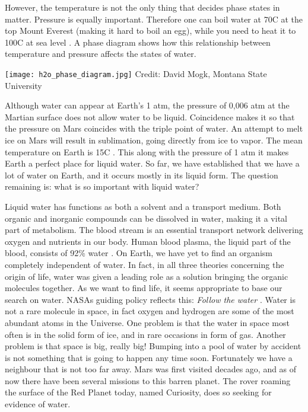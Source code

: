 However, the temperature is not the only thing that decides phase states in matter.
Pressure is equally important.
Therefore one can boil water at 70\degree C at the top Mount Everest (making it hard to boil an egg), while you need to heat it to 100\degree C at sea level \cite{WaterEverest}.
A phase diagram shows how this relationship between temperature and pressure affects the states of water.

\begin{center}
	\texttt{[image: h2o\_phase\_diagram.jpg]}
	\tiny{Credit: David Mogk, Montana State University}
\end{center}

Although water can appear at Earth's 1 atm, the pressure of 0,006 atm at the Martian surface \cite{NASA-rover} does not allow water to be liquid.
Coincidence makes it so that the pressure on Mars coincides with the triple point of water.
An attempt to melt ice on Mars will result in sublimation, going directly from ice to vapor.
The mean temperature on Earth is 15\degree C \cite{TempEarth}.
This along with the pressure of 1 atm it makes Earth a perfect place for liquid water. 
So far, we have established that we have a lot of water on Earth, and it occurs mostly in its liquid form.
The question remaining is: what is so important with liquid water?

Liquid water has functions as both a solvent and a transport medium.
Both organic and inorganic compounds can be dissolved in water, making it a vital part of metabolism.
The blood stream is an essential transport network delivering oxygen and nutrients in our body.
Human blood plasma, the liquid part of the blood, consists of 92\% water \cite{Blood}.
On Earth, we have yet to find an organism completely independent of water. 
In fact, in all three theories concerning the origin of life, water was given a leading role as a solution bringing the organic molecules together.
As we want to find life, it seems appropriate to base our search on water.
NASAs guiding policy reflects this: \textit{Follow the water} \cite{NASAwater}. 
Water is not a rare molecule in space, in fact oxygen and hydrogen are some of the most abundant atoms in the Universe.
One problem is that the water in space most often is in the solid form of ice, and in rare occasions in form of gas.
Another problem is that space is big, really big!
Bumping into a pool of water by accident is not something that is going to happen any time soon.
Fortunately we have a neighbour that is not too far away.
Mars was first visited decades ago, and as of now there have been several missions to this barren planet.
The rover roaming the surface of the Red Planet today, named Curiosity, does so seeking for evidence of water.